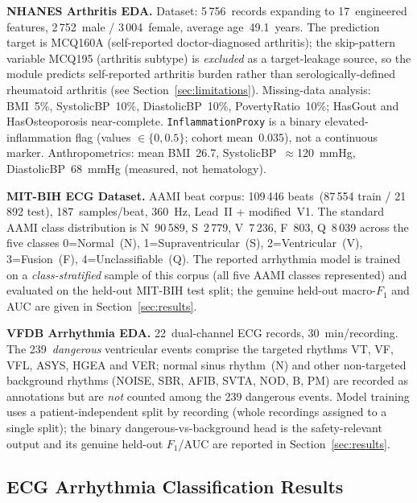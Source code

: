 \documentclass[AMA,STIX1COL,]{WileyNJD-v2}
\begin{document}
\noindent\textbf{NHANES Arthritis EDA.}
Dataset: 5\,756~records expanding to 17~engineered features,
2\,752~male / 3\,004~female, average age~49.1~years. The prediction
target is MCQ160A (self-reported doctor-diagnosed arthritis); the
skip-pattern variable MCQ195 (arthritis subtype) is \emph{excluded}
as a target-leakage source, so the module predicts self-reported
arthritis burden rather than serologically-defined rheumatoid
arthritis (see Section~\ref{sec:limitations}).
Missing-data analysis: BMI~5\%, SystolicBP~10\%,
DiastolicBP~10\%, PovertyRatio~10\%; HasGout and HasOsteoporosis
near-complete. \texttt{InflammationProxy} is a binary
elevated-inflammation flag (values $\in\{0,0.5\}$; cohort mean~0.035),
not a continuous marker. Anthropometrics: mean BMI~26.7,
SystolicBP~$\approx$120~mmHg, DiastolicBP~68~mmHg (measured, not
hematology).

\noindent\textbf{MIT-BIH ECG Dataset.}
AAMI beat corpus: 109\,446 beats~(87\,554 train / 21\,892 test),
187~samples/beat, 360~Hz, Lead~II + modified~V1. The standard AAMI
class distribution is N~90\,589, S~2\,779, V~7\,236, F~803,
Q~8\,039 across the five classes 0=Normal~(N),
1=Supraventricular~(S), 2=Ventricular~(V), 3=Fusion~(F),
4=Unclassifiable~(Q). The reported arrhythmia model is trained on a
\emph{class-stratified} sample of this corpus (all five AAMI classes
represented) and evaluated on the held-out MIT-BIH test split; the
genuine held-out macro-$F_1$ and AUC are given in
Section~\ref{sec:results}.

\noindent\textbf{VFDB Arrhythmia EDA.}
22~dual-channel ECG records, 30~min/recording. The 239~\emph{dangerous}
ventricular events comprise the targeted rhythms VT, VF, VFL, ASYS,
HGEA and VER; normal sinus rhythm~(N) and other non-targeted
background rhythms (NOISE, SBR, AFIB, SVTA, NOD, B, PM) are recorded
as annotations but are \emph{not} counted among the 239 dangerous
events. Model training uses a patient-independent split by recording
(whole recordings assigned to a single split); the binary
dangerous-vs-background head is the safety-relevant output and its
genuine held-out $F_1$/AUC are reported in Section~\ref{sec:results}.

\subsection{ECG Arrhythmia Classification Results}
\end{document}

